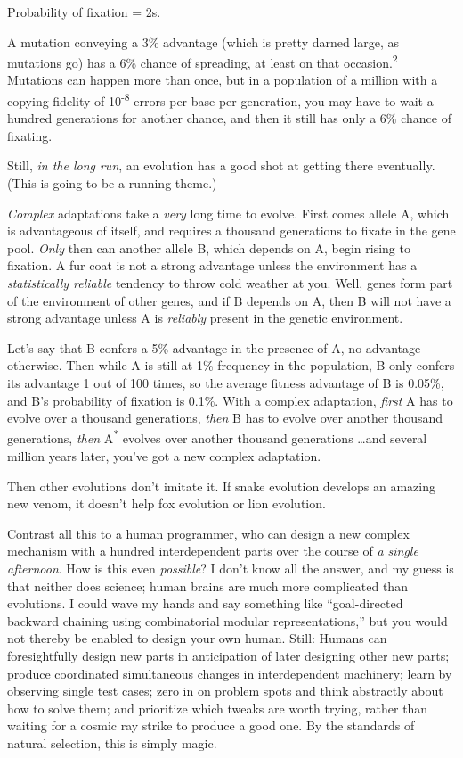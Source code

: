 {\centering
 Probability of fixation = 2s.
\par}


\bigskip

{
 A mutation conveying a 3\% advantage (which is pretty darned
large, as mutations go) has a 6\% chance of spreading, at least on that
occasion.\textsuperscript{2} Mutations can happen more than once, but
in a population of a million with a copying fidelity of
10\textsuperscript{{}-8} errors per base per generation, you may have
to wait a hundred generations for another chance, and then it still has
only a 6\% chance of fixating. }

{
 Still, \textit{in the long run}, an evolution has a good shot at
getting there eventually. (This is going to be a running theme.)}

{
 \textit{Complex} adaptations take a \textit{very} long time to
evolve. First comes allele A, which is advantageous of itself, and
requires a thousand generations to fixate in the gene pool.
\textit{Only} then can another allele B, which depends on A, begin
rising to fixation. A fur coat is not a strong advantage unless the
environment has a \textit{statistically reliable} tendency to throw
cold weather at you. Well, genes form part of the environment of other
genes, and if B depends on A, then B will not have a strong advantage
unless A is \textit{reliably} present in the genetic environment.}

{
 Let's say that B confers a 5\% advantage in the
presence of A, no advantage otherwise. Then while A is still at 1\%
frequency in the population, B only confers its advantage 1 out of 100
times, so the average fitness advantage of B is 0.05\%, and
B's probability of fixation is 0.1\%. With a complex
adaptation, \textit{first} A has to evolve over a thousand generations,
\textit{then} B has to evolve over another thousand generations,
\textit{then} A\textsuperscript{*} evolves over another thousand
generations \ldots and several million years later,
you've got a new complex adaptation.}

{
 Then other evolutions don't imitate it. If snake
evolution develops an amazing new venom, it doesn't
help fox evolution or lion evolution.}

{
 Contrast all this to a human programmer, who can design a new
complex mechanism with a hundred interdependent parts over the course
of \textit{a single afternoon}. How is this even \textit{possible}? I
don't know all the answer, and my guess is that neither
does science; human brains are much more complicated than evolutions. I
could wave my hands and say something like
``goal-directed backward chaining using combinatorial
modular representations,'' but you would not thereby
be enabled to design your own human. Still: Humans can foresightfully
design new parts in anticipation of later designing other new parts;
produce coordinated simultaneous changes in interdependent machinery;
learn by observing single test cases; zero in on problem spots and
think abstractly about how to solve them; and prioritize which tweaks
are worth trying, rather than waiting for a cosmic ray strike to
produce a good one. By the standards of natural selection, this is
simply magic.}

